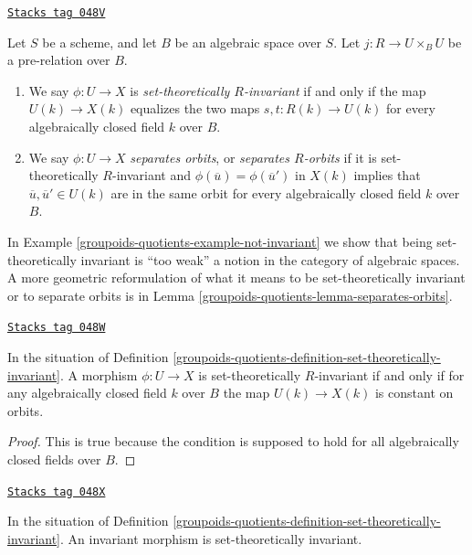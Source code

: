 \begin{definition}
\label{groupoids-quotients-definition-set-theoretically-invariant}
\href{https://stacks.math.columbia.edu/tag/048V}{\texttt{Stacks tag 048V}}

Let $S$ be a scheme, and let $B$ be an algebraic space over $S$.
Let $j : R \to U \times_B U$ be a pre-relation over $B$.
\begin{enumerate}
\item We say $\phi : U \to X$ is {\it set-theoretically $R$-invariant}
if and only if the map $U(k) \to X(k)$ equalizes the two maps
$s, t : R(k) \to U(k)$ for every algebraically closed field $k$
over $B$.
\item We say $\phi : U \to X$ {\it separates orbits}, or
{\it separates $R$-orbits} if it is set-theoretically $R$-invariant and
$\phi(\overline{u}) = \phi(\overline{u}')$ in $X(k)$ implies that
$\overline{u}, \overline{u}' \in U(k)$ are in the same orbit
for every algebraically closed field $k$ over $B$.
\end{enumerate}
\end{definition}

In
Example \ref{groupoids-quotients-example-not-invariant}
we show that being set-theoretically invariant is ``too weak'' a notion in
the category of algebraic spaces. A more geometric reformulation
of what it means to be set-theoretically invariant or to separate orbits is in
Lemma \ref{groupoids-quotients-lemma-separates-orbits}.

\begin{lemma}
\label{groupoids-quotients-lemma-set-theoretic-invariant}
\href{https://stacks.math.columbia.edu/tag/048W}{\texttt{Stacks tag 048W}}

In the situation of Definition \ref{groupoids-quotients-definition-set-theoretically-invariant}.
A morphism $\phi : U \to X$ is set-theoretically $R$-invariant if and
only if for any algebraically closed field $k$ over $B$ the map
$U(k) \to X(k)$ is constant on orbits.
\end{lemma}

\begin{proof}
This is true because the condition is supposed to hold for all algebraically
closed fields over $B$.
\end{proof}

\begin{lemma}
\label{groupoids-quotients-lemma-invariant-set-theoretically-invariant}
\href{https://stacks.math.columbia.edu/tag/048X}{\texttt{Stacks tag 048X}}

In the situation of Definition \ref{groupoids-quotients-definition-set-theoretically-invariant}.
An invariant morphism is set-theoretically invariant.
\end{lemma}

